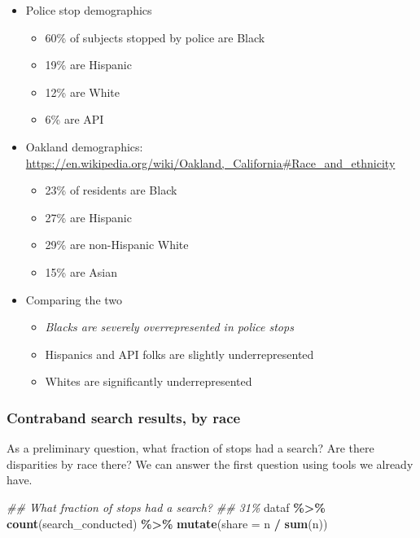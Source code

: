 \documentclass[
]{article}
\newenvironment{Shaded}{\begin{snugshade}}{\end{snugshade}}
\newcommand{\CommentTok}[1]{\textcolor[rgb]{0.56,0.35,0.01}{\textit{#1}}}
\newcommand{\DataTypeTok}[1]{\textcolor[rgb]{0.13,0.29,0.53}{#1}}
\newcommand{\KeywordTok}[1]{\textcolor[rgb]{0.13,0.29,0.53}{\textbf{#1}}}
\newcommand{\NormalTok}[1]{#1}
\newcommand{\OperatorTok}[1]{\textcolor[rgb]{0.81,0.36,0.00}{\textbf{#1}}}
\newcommand{\StringTok}[1]{\textcolor[rgb]{0.31,0.60,0.02}{#1}}
\providecommand{\tightlist}{%
  \setlength{\itemsep}{0pt}\setlength{\parskip}{0pt}}
\begin{document}
\begin{itemize}
\tightlist
\item
  Police stop demographics

  \begin{itemize}
  \tightlist
  \item
    60\% of subjects stopped by police are Black
  \item
    19\% are Hispanic
  \item
    12\% are White
  \item
    6\% are API
  \end{itemize}
\item
  Oakland demographics: \url{https://en.wikipedia.org/wiki/Oakland,_California\#Race_and_ethnicity}

  \begin{itemize}
  \tightlist
  \item
    23\% of residents are Black
  \item
    27\% are Hispanic
  \item
    29\% are non-Hispanic White
  \item
    15\% are Asian
  \end{itemize}
\item
  Comparing the two

  \begin{itemize}
  \tightlist
  \item
    \emph{Blacks are severely overrepresented in police stops}
  \item
    Hispanics and API folks are slightly underrepresented
  \item
    Whites are significantly underrepresented
  \end{itemize}
\end{itemize}

\hypertarget{contraband-search-results-by-race}{%
\subsubsection{Contraband search results, by race}\label{contraband-search-results-by-race}}

As a preliminary question, what fraction of stops had a search? Are there disparities by race there? We can answer the first question using tools we already have.

\begin{Shaded}
\begin{Highlighting}[]
\CommentTok{\#\# What fraction of stops had a search? }
\CommentTok{\#\# 31\%}
\NormalTok{dataf }\OperatorTok{\%\textgreater{}\%}\StringTok{ }
\StringTok{    }\KeywordTok{count}\NormalTok{(search\_conducted) }\OperatorTok{\%\textgreater{}\%}\StringTok{ }
\StringTok{    }\KeywordTok{mutate}\NormalTok{(}\DataTypeTok{share =}\NormalTok{ n }\OperatorTok{/}\StringTok{ }\KeywordTok{sum}\NormalTok{(n))}
\end{Highlighting}
\end{Shaded}
\end{document}
